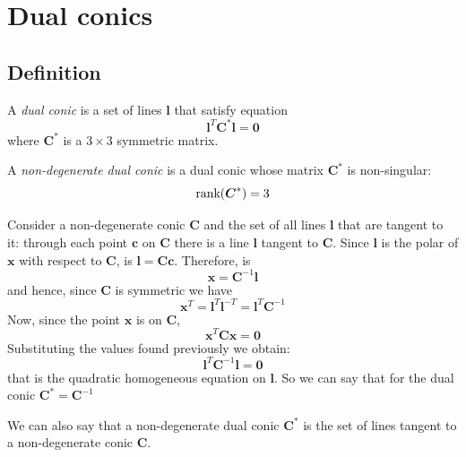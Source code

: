 \documentclass[12pt, a4paper]{report}
\begin{document}
    \section{Dual conics}
    \subsection{Definition}
    \begin{definition}
        A \emph{dual conic} is a set of lines $\boldsymbol{l}$ that satisfy equation
        \[\boldsymbol{l}^T\boldsymbol{C}^{*}\boldsymbol{l}=\boldsymbol{0}\]
        where $\boldsymbol{C}^{*}$ is a $3 \times 3$ symmetric matrix.

        A \emph{non-degenerate dual conic} is a dual conic whose matrix $\boldsymbol{C}^{*}$ is non-singular: 
        \[\textnormal{rank}(\boldsymbol{C}^{*})=3\]
    \end{definition}
    Consider a non-degenerate conic $\boldsymbol{C}$ and the set of all lines $\boldsymbol{l}$ that are tangent to it: through each point $\boldsymbol{c}$ on $\boldsymbol{C}$ there is a line 
    $\boldsymbol{l}$ tangent to $\boldsymbol{C}$. Since $\boldsymbol{l}$ is the polar of $\boldsymbol{x}$ with respect to $\boldsymbol{C}$, is $\boldsymbol{l}=\boldsymbol{Cc}$. Therefore, is
    \[\boldsymbol{x}=\boldsymbol{C}^{-1}\boldsymbol{l}\]
    and hence, since $\boldsymbol{C}$ is symmetric we have 
    \[\boldsymbol{x}^T=\boldsymbol{l}^T\boldsymbol{l}^{-T}=\boldsymbol{l}^T\boldsymbol{C}^{-1}\]
    Now, since the point $\boldsymbol{x}$ is on $\boldsymbol{C}$,
    \[\boldsymbol{x}^T\boldsymbol{C}\boldsymbol{x}=\boldsymbol{0}\]
    Substituting the values found previously we obtain: 
    \[\boldsymbol{l}^T\boldsymbol{C}^{-1}\boldsymbol{l}=\boldsymbol{0}\]
    that is the quadratic homogeneous equation on $\boldsymbol{l}$. So we can say that for the dual conic $\boldsymbol{C}^{*}=\boldsymbol{C}^{-1}$

    We can also say that a non-degenerate dual conic $\boldsymbol{C}^{*}$ is the set of lines tangent to a non-degenerate conic $\boldsymbol{C}$. 
\end{document}
